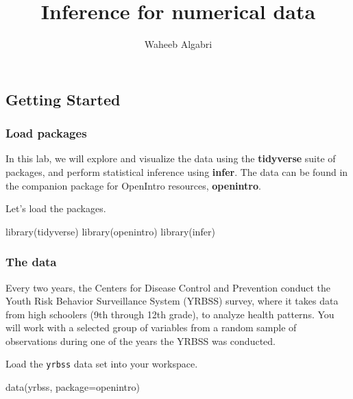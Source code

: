 \documentclass[
]{article}
\title{Inference for numerical data}
\author{Waheeb Algabri}
\date{}
\newenvironment{Shaded}{\begin{snugshade}}{\end{snugshade}}
\newcommand{\AttributeTok}[1]{\textcolor[rgb]{0.77,0.63,0.00}{#1}}
\newcommand{\FunctionTok}[1]{\textcolor[rgb]{0.00,0.00,0.00}{#1}}
\newcommand{\NormalTok}[1]{#1}
\newcommand{\StringTok}[1]{\textcolor[rgb]{0.31,0.60,0.02}{#1}}
\begin{document}
\maketitle

\hypertarget{getting-started}{%
\subsection{Getting Started}\label{getting-started}}

\hypertarget{load-packages}{%
\subsubsection{Load packages}\label{load-packages}}

In this lab, we will explore and visualize the data using the
\textbf{tidyverse} suite of packages, and perform statistical inference
using \textbf{infer}. The data can be found in the companion package for
OpenIntro resources, \textbf{openintro}.

Let's load the packages.

\begin{Shaded}
\begin{Highlighting}[]
\FunctionTok{library}\NormalTok{(tidyverse)}
\FunctionTok{library}\NormalTok{(openintro)}
\FunctionTok{library}\NormalTok{(infer)}
\end{Highlighting}
\end{Shaded}

\hypertarget{the-data}{%
\subsubsection{The data}\label{the-data}}

Every two years, the Centers for Disease Control and Prevention conduct
the Youth Risk Behavior Surveillance System (YRBSS) survey, where it
takes data from high schoolers (9th through 12th grade), to analyze
health patterns. You will work with a selected group of variables from a
random sample of observations during one of the years the YRBSS was
conducted.

Load the \texttt{yrbss} data set into your workspace.

\begin{Shaded}
\begin{Highlighting}[]
\FunctionTok{data}\NormalTok{(}\StringTok{\textquotesingle{}yrbss\textquotesingle{}}\NormalTok{, }\AttributeTok{package=}\StringTok{\textquotesingle{}openintro\textquotesingle{}}\NormalTok{)}
\end{Highlighting}
\end{Shaded}
\end{document}
